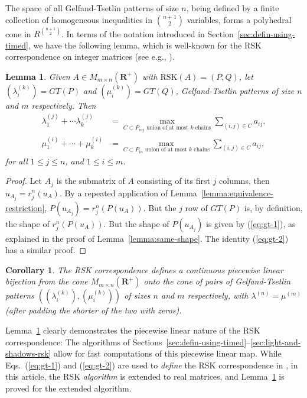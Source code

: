 \documentclass[10pt]{amsproc}
\newtheorem{lemma}[theorem]{Lemma}
\newtheorem{corollary}[theorem]{Corollary}
\theoremstyle{definition}
\theoremstyle{remark}
\newcommand{\rp}{\mathbf{R}^+}
\newcommand{\rsk}{\mathrm{RSK}}
\begin{document}
The space of all Gelfand-Tsetlin patterns of size $n$, being defined by a finite collection of homogeneous inequalities in $\binom{n+1}2$ variables, forms a polyhedral cone in $R^{\binom{n+1}2}$.
In terms of the notation introduced in Section~\ref{sec:defin-using-timed}, we have the following lemma, which is well-known for the RSK correspondence on integer matrices (see e.g., \cite[Prop.~2.26]{kir-trop}).
\begin{lemma}
  \label{lemma:pl}
  Given $A\in M_{m\times n}(\rp)$ with $\rsk(A)=(P,Q)$, let $(\lambda^{(k)}_i)=GT(P)$ and $(\mu^{(k)}_i)=GT(Q)$, Gelfand-Tsetlin patterns of size $n$ and $m$ respectively.
  Then
  \begin{align}
    \label{eq:gt-1}
    \lambda^{(j)}_1 + \dotsb \lambda_k^{(j)} & = \max_{C\subset P_{mj}\text{ union of at most $k$ chains}} \sum_{(i,j)\in C} a_{ij},\\
    \label{eq:gt-2}
    \mu_1^{(i)} + \dotsb + \mu_k^{(i)} & = \max_{C\subset P_{in}\text{ union of at most $k$ chains}} \sum_{(i,j)\in C} a_{ij},
  \end{align}
  for all $1\leq j\leq n$, and $1\leq i\leq m$.
\end{lemma}
\begin{proof}
  Let $A_j$ is the submatrix of $A$ consisting of its first $j$ columns, then $u_{A_j} = r^n_j(u_A)$.
  By a repeated application of Lemma~\ref{lemma:equivalence-restriction}, $P(u_{A_j}) = r^n_j(P(u_A))$.
  But the $j$ row of $GT(P)$ is, by definition, the shape of $r^n_j(P(u_A))$.
  But the shape of $P(u_{A_j})$ is given by (\ref{eq:gt-1}), as explained in the proof of Lemma~\ref{lemma:same-shape}.
  The identity (\ref{eq:gt-2}) has a similar proof.
\end{proof}
\begin{corollary}
  The RSK correspondence defines a continuous piecewise linear bijection from the cone $M_{m\times n}(\rp)$ onto the cone of pairs of Gelfand-Tsetlin patterns $((\lambda^{(k)}_i), (\mu^{(k)}_i))$ of sizes $n$ and $m$ respectively, with $\lambda^{(n)}=\mu^{(m)}$ (after padding the shorter of the two with zeros).
\end{corollary}
Lemma~\ref{lemma:pl} clearly demonstrates the piecewise linear nature of the RSK correspondence:
The algorithms of Sections~\ref{sec:defin-using-timed}--\ref{sec:light-and-shadows-rsk} allow for fast computations of this piecewise linear map.
While Eqs.~(\ref{eq:gt-1}) and (\ref{eq:gt-2}) are used to \emph{define} the RSK correspondence in \cite{kir-trop}, in this article, the RSK \emph{algorithm} is extended to real matrices, and Lemma~\ref{lemma:pl} is proved for the extended algorithm.
\end{document}
